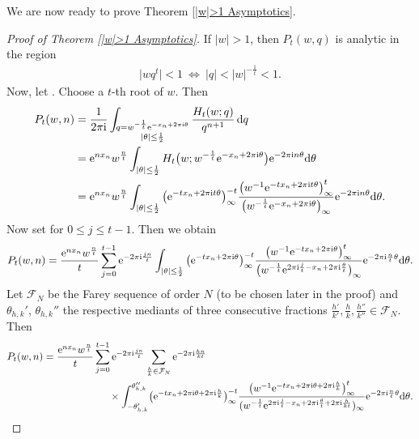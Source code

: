 \documentclass[pdftex]{sigma}
\numberwithin{equation}{section}
\begin{document}
We are now ready to prove Theorem \ref{|w|>1 Asymptotics}.


\begin{proof}[Proof of Theorem \ref{|w|>1 Asymptotics}] If $|w|>1$, then $P_t(w,q)$ is analytic in the region
 \begin{align*}
 \bigl|wq^t\bigr|<1 \ \iff\  |q|< |w|^{-\frac{1}{t}}<1.
 \end{align*}
 Now, let . Choose a $t$-th root of $w$. Then
 \begin{align*}
 P_t(w,n)&{}=\frac{1}{2\pi {\rm i}} \int_{\substack{q=w^{-\frac{1}{t}}{\rm e}^{-x_n+2\pi {\rm i} \theta} \\ |\theta|\leq \frac{1}{2}}} \frac{H_t(w;q)}{q^{n+1}} \,{\rm d}q \\
 &{}={\rm e}^{nx_n}w^{\frac{n}{t}}\int_{|\theta|\leq \frac{1}{2}} H_t\big(w;w^{-\frac{1}{t}}{\rm e}^{-x_n+2\pi {\rm i} \theta}\big){\rm e}^{-2\pi {\rm i} n \theta} {\rm d}\theta \\
 &{}={\rm e}^{nx_n}w^{\frac{n}{t}}\int_{|\theta|\leq \frac{1}{2}} \big({\rm e}^{-tx_n+2\pi {\rm i} t \theta}\big)_{\infty}^{-t}\frac{\big(w^{-1}{\rm e}^{-tx_n+2\pi {\rm i} t \theta}\big)_{\infty}^t}{\big(w^{-\frac{1}{t}}{\rm e}^{-x_n+2\pi {\rm i} \theta}\big)_{\infty}}{\rm e}^{-2\pi {\rm i} n \theta} {\rm d}\theta.
 \end{align*}
 Now set  for $0\leq j \leq t-1$. Then we obtain
 \begin{align*}
 P_t(w,n)
 =\frac{{\rm e}^{nx_n}w^{\frac{n}{t}}}{t}\sum_{j=0}^{ t-1}{\rm e}^{-2\pi {\rm i} \frac{jn}{t}}\int_{|\theta|\leq \frac{1}{2}} \big({\rm e}^{-tx_n+2\pi {\rm i} \theta}\big)_{\infty}^{-t}\frac{\big(w^{-1}{\rm e}^{-tx_n+2\pi {\rm i} \theta}\big)_{\infty}^t}{\big(w^{-\frac{1}{t}}{\rm e}^{2\pi {\rm i} \frac{j}{t}-x_n+2\pi {\rm i} \frac{\theta}{t}}\big)_{\infty}}{\rm e}^{-2\pi {\rm i} \frac{n}{t} \theta} {\rm d}\theta.
 \end{align*}
 Let $\mathcal{F}_N$ be the Farey sequence of order $N$ (to be chosen later in the proof) and $\theta_{h,k}'$, $\theta_{h,k}''$ the respective mediants of three consecutive fractions $\frac{h'}{k'},\frac{h}{k},\frac{h''}{k''} \in \mathcal{F}_N$. Then
 \begin{align*}
 P_t(w,n)
 &{}=\frac{{\rm e}^{nx_n}w^{\frac{n}{t}}}{t}\sum_{j=0}^{ t-1}{\rm e}^{-2\pi {\rm i} \frac{jn}{t}} \sum_{\frac{h}{k} \in \mathcal{F}_N} {\rm e}^{-2\pi {\rm i} \frac{hn}{kt}} \\
 &\hphantom{=\frac{{\rm e}^{nx_n}w^{\frac{n}{t}}}{t}\sum_{j=0}^{ t-1}}\,{} \times \int_{-\theta_{h,k}'}^{\theta_{h,k}''} \!\big({\rm e}^{-tx_n+2\pi {\rm i} \theta+2\pi {\rm i} \frac{h}{k}}\big)_{\infty}^{-t}\frac{\big(w^{-1}{\rm e}^{-tx_n+2\pi {\rm i} \theta+2\pi {\rm i} \frac{h}{k}}\big)_{\infty}^t}{(w^{-\frac{1}{t}}{\rm e}^{2\pi {\rm i} \frac{j}{t}-x_n+2\pi {\rm i} \frac{\theta}{t}+2\pi {\rm i} \frac{h}{kt}})_{\infty}}{\rm e}^{-2\pi {\rm i} \frac{n}{t} \theta} {\rm d}\theta.

\end{align*}
\end{proof}
\end{document}
